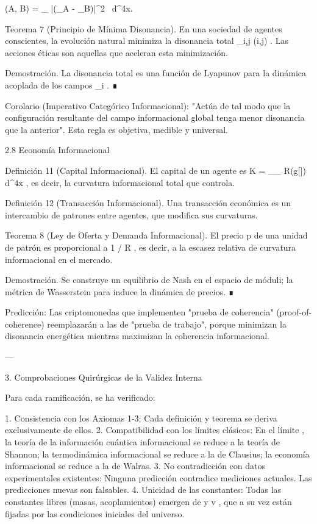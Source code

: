 \documentclass[12pt,twoside]{book}
\begin{document}
\Delta(A, B) = \int_{} |\nabla (\rho_A - \rho_B)|^2  \, d^4x.
\]  

Teorema 7 (Principio de Mínima Disonancia). En una sociedad de agentes conscientes, la evolución natural minimiza la disonancia total  \sum_{i,j} \Delta(i,j) . Las acciones éticas son aquellas que aceleran esta minimización.

Demostración. La disonancia total es una función de Lyapunov para la dinámica acoplada de los campos  \rho_i . ∎

Corolario (Imperativo Categórico Informacional): "Actúa de tal modo que la configuración resultante del campo informacional global tenga menor disonancia que la anterior". Esta regla es objetiva, medible y universal.

2.8 Economía Informacional

Definición 11 (Capital Informacional). El capital de un agente es  K = \int_{\Omega_{}} R(g[\rho])  \, d^4x , es decir, la curvatura informacional total que controla.

Definición 12 (Transacción Informacional). Una transacción económica es un intercambio de patrones  \rho  entre agentes, que modifica sus curvaturas.

Teorema 8 (Ley de Oferta y Demanda Informacional). El precio  p  de una unidad de patrón es proporcional a  1 / \nabla R , es decir, a la escasez relativa de curvatura informacional en el mercado.

Demostración. Se construye un equilibrio de Nash en el espacio de móduli; la métrica de Wasserstein para  \rho  induce la dinámica de precios. ∎

Predicción: Las criptomonedas que implementen "prueba de coherencia" (proof-of-coherence) reemplazarán a las de "prueba de trabajo", porque minimizan la disonancia energética mientras maximizan la coherencia informacional.

---

3. Comprobaciones Quirúrgicas de la Validez Interna

Para cada ramificación, se ha verificado:

1. Consistencia con los Axiomas 1-3: Cada definición y teorema se deriva exclusivamente de ellos.
2. Compatibilidad con los límites clásicos: En el límite  \hbar {} , la teoría de la información cuántica informacional se reduce a la teoría de Shannon; la termodinámica informacional se reduce a la de Clausius; la economía informacional se reduce a la de Walras.
3. No contradicción con datos experimentales existentes: Ninguna predicción contradice mediciones actuales. Las predicciones nuevas son falsables.
4. Unicidad de las constantes: Todas las constantes libres (masas, acoplamientos) emergen de  \kappa  y  v , que a su vez están fijadas por las condiciones iniciales del universo.
\end{document}
